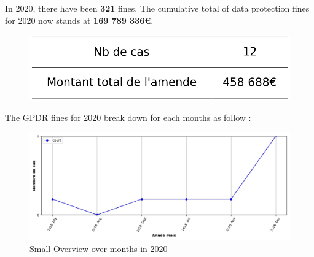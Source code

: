 \documentclass[12pt]{article}
\begin{document}
	\begin{multicols}{2}
	
	In 2020, there have been \textbf{321} fines.
	The cumulative total of data protection fines for 2020 now stands at \textbf{169 789 336€}.
	
	\begin{figure}[H]
	\centering\includegraphics[width=1\linewidth]{graphs/counter_year}
	\end{figure}


	The GPDR fines for 2020 break down for each months as follow :

	\begin{figure}
	[H]\centering\includegraphics[width = 1.2\linewidth]{graphs/NbFinesPerMonth_year_graph}
	\caption{Small Overview over months in 2020}
	\end{figure}

	\end{multicols}
\end{document}
